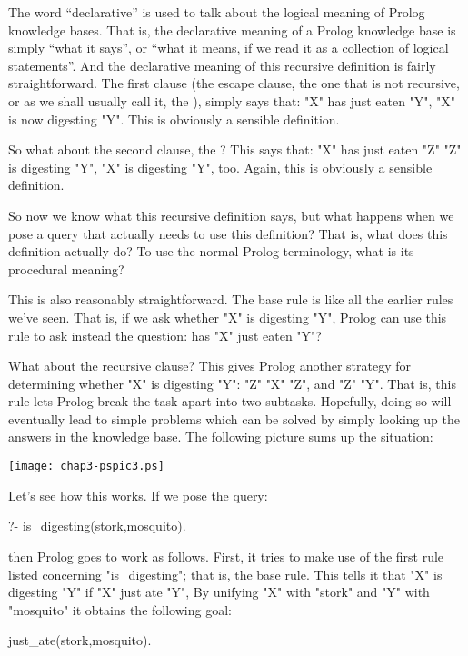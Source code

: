 The word ``declarative'' is used to talk about the logical meaning of
Prolog knowledge bases.  That is, the declarative meaning of a Prolog
knowledge base is simply ``what it says'', or ``what it means, if we read
it as a collection of logical statements''.  And the declarative
meaning of this recursive definition is fairly straightforward.  The
first clause (the escape clause, the one that is not recursive, or
as we shall usually call it, the ), simply says
that:  "X" has just eaten "Y",  "X" is now
digesting "Y".  This is obviously a sensible definition.

So what about the second clause, the ?  This
says that:  "X" has just eaten "Z"
 "Z" is digesting "Y",  "X"
is digesting "Y", too. Again, this is obviously a sensible
definition.

So now we know what this recursive definition says, but what happens
when we pose a query that actually needs to use this definition?  That
is, what does this definition actually do?  To use the normal Prolog
terminology, what is its procedural meaning?

This is also reasonably straightforward.  The base rule is like all
the earlier rules we've seen.  That is, if we ask whether "X" is
digesting "Y", Prolog can use this rule to ask instead
the question: has "X" just eaten "Y"?

What about the recursive clause?  This gives Prolog another strategy
for determining whether "X" is digesting "Y":
 "Z"  "X"
 "Z", and "Z" 
"Y".  That is, this rule lets Prolog break the task
apart into two subtasks.  Hopefully, doing so will eventually lead to
simple problems which can be solved by simply looking up the answers
in the knowledge base. The following picture sums up the situation:

\medskip

\begin{center}
\texttt{[image: chap3-pspic3.ps]}
\end{center}

Let's see how this works. If we pose the query:
\begin{LPNcodedisplay}
?- is_digesting(stork,mosquito).
\end{LPNcodedisplay}
then Prolog goes to work as follows.  First, it tries to make use of
the first rule listed concerning "is_digesting"; that is, the
base rule.  This tells it that "X" is digesting
"Y" if "X" just ate "Y", By unifying
"X" with "stork" and "Y" with
"mosquito" it obtains the following goal:
\begin{LPNcodedisplay}
just_ate(stork,mosquito).
\end{LPNcodedisplay}


